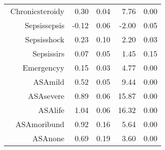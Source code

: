 \begin{tabular}{rrrrr}
$$  Chronic\-steroid\-y & 0.30 & 0.04 & 7.76 & 0.00 \\ 
  Sepsis\-sepsis & -0.12 & 0.06 & -2.00 & 0.05 \\ 
  Sepsis\-shock & 0.23 & 0.10 & 2.20 & 0.03 \\ 
  Sepsis\-sirs & 0.07 & 0.05 & 1.45 & 0.15 \\ 
  Emergency\-y & 0.15 & 0.03 & 4.77 & 0.00 \\ 
  ASA\-mild & 0.52 & 0.05 & 9.44 & 0.00 \\ 
  ASA\-severe & 0.89 & 0.06 & 15.87 & 0.00 \\ 
  ASA\-life & 1.04 & 0.06 & 16.32 & 0.00 \\ 
  ASA\-moribund & 0.92 & 0.16 & 5.64 & 0.00 \\ 
  ASA\-none & 0.69 & 0.19 & 3.60 & 0.00 \\ 
   \hline
\end{tabular}

